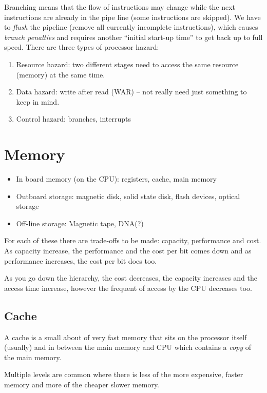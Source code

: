 Branching means that the flow of instructions may change while the next instructions are already in the pipe line (some instructions are skipped).
We have to \emph{flush} the pipeline (remove all currently incomplete instructions), which causes \emph{branch penalties} and requires another ``initial start-up time'' to get back up to full speed.
There are three types of processor hazard:
\begin{enumerate}
	\item Resource hazard: two different stages need to access the same resource (memory) at the same time.
	\item Data hazard: write after read (WAR) -- not really need just something to keep in mind.
	\item Control hazard: branches, interrupts
\end{enumerate}
\section{Memory}\label{sec:memory}

\begin{itemize}
	\item In board memory (on the CPU): registers, cache, main memory
	\item Outboard storage: magnetic disk, solid state disk, flash devices, optical storage
	\item Off-line storage: Magnetic tape, DNA(?)
\end{itemize}
%
For each of these there are trade-offs to be made: capacity, performance and cost.
As capacity increase, the performance and the cost per bit comes down and as performance increases, the cost per bit does too.

As you go down the hierarchy, the cost decreases, the capacity increases and the access time increase, however the frequent of access by the CPU decreases too.

\subsection{Cache}\label{sub:cache}

A cache is a small about of very fast memory that sits on the processor itself (usually) and in between the main memory and CPU which contains a \emph{copy} of the main memory.

Multiple levels are common where there is less of the more expensive, faster memory and more of the cheaper slower memory.

